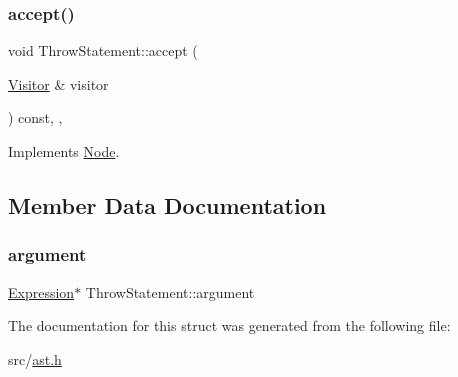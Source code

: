 \subsubsection{\texorpdfstring{accept()}{accept()}}
{\footnotesize\ttfamily void Throw\+Statement\+::accept (\begin{DoxyParamCaption}\item[{\hyperlink{struct_visitor}{Visitor} \&}]{visitor }\end{DoxyParamCaption}) const\hspace{0.3cm}{\ttfamily [inline]}, {\ttfamily [override]}, {\ttfamily [virtual]}}



Implements \hyperlink{struct_node_a10bd7af968140bbf5fa461298a969c71}{Node}.



\subsection{Member Data Documentation}
\mbox{\label{struct_throw_statement_a87b057f38ecbe03a687dec1204a7387a}} 
\subsubsection{\texorpdfstring{argument}{argument}}
{\footnotesize\ttfamily \hyperlink{struct_expression}{Expression}$\ast$ Throw\+Statement\+::argument}



The documentation for this struct was generated from the following file\+:\begin{DoxyCompactItemize}
\item 
src/\hyperlink{ast_8h}{ast.\+h}\end{DoxyCompactItemize}
